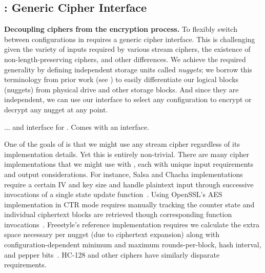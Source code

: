 \subsection{\sysB: Generic Cipher Interface}\label{subsec:des-crypts}

\textbf{Decoupling ciphers from the encryption process.} To flexibly switch
between configurations in \sys requires a generic cipher interface. This is
challenging given the variety of inputs required by various stream ciphers, the
existence of non-length-preserving ciphers, and other differences. We achieve
the required generality by defining independent storage units called
\emph{nuggets}; we borrow this terminology from prior work (see
\cite{StrongBox}) to easily differentiate our logical blocks (nuggets) from
physical drive and other storage blocks. And since they are independent, we can
use our interface to select any configuration to encrypt or decrypt any nugget
at any point.

... and interface for \sysB. Comes with an interface.


One of the goals of \sys is that we might use any stream cipher regardless of
its implementation details. Yet this is entirely non-trivial. There are many
cipher implementations that we might use with \sys, each with unique input
requirements and output considerations. For instance, Salsa and Chacha
implementations require a certain IV and key size and handle plaintext input
through successive invocations of a single state update
function~\cite{Floodyberry}. Using OpenSSL's AES implementation in CTR mode
requires manually tracking the counter state and individual ciphertext blocks
are retrieved though corresponding function invocations~\cite{OpenSSL}.
Freestyle's reference implementation requires we calculate the extra space
necessary per nugget (due to ciphertext expansion) along with
configuration-dependent minimum and maximum rounds-per-block, hash interval, and
pepper bits~\cite{Freestyle}. HC-128 and other ciphers have similarly disparate
requirements.


